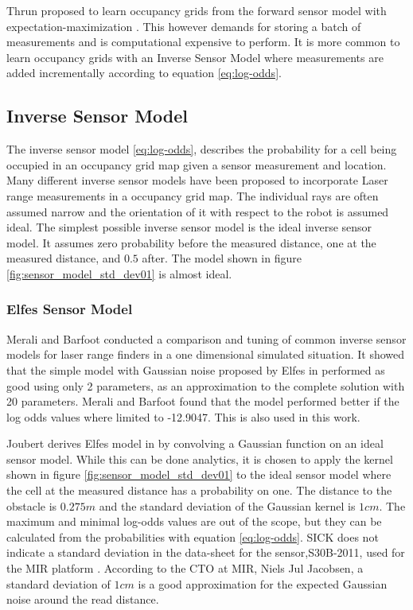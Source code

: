 Thrun proposed to learn occupancy grids from the forward sensor model with expectation-maximization \cite{probRob}.
This however demands for storing a batch of measurements and is computational expensive to perform. 
It is more common to learn occupancy grids with an Inverse Sensor Model where measurements are added incrementally according to equation \ref{eq:log-odds}. 

\subsection{Inverse Sensor Model}
The inverse sensor model \ref{eq:log-odds}, describes the probability for a cell being occupied in an occupancy grid map given a sensor measurement and location.
Many different inverse sensor models have been proposed to incorporate Laser range measurements in a occupancy grid map. The individual rays are often assumed narrow and the orientation of it with respect to the robot is assumed ideal.
The simplest possible inverse sensor model is the 
ideal inverse sensor model. It assumes zero probability before the measured distance, one at the measured distance, and $0.5$ after. The model shown in figure \ref{fig:sensor_model_std_dev01} is almost ideal.

\subsubsection{Elfes Sensor Model}
Merali and Barfoot \cite{sensorModelTuning} conducted a comparison and tuning of common inverse sensor models for laser range finders in a one dimensional simulated situation. It showed that the simple model with Gaussian noise proposed by Elfes in \cite{elfes} performed as good using only 2 parameters, as an approximation to the complete solution with 20 parameters. Merali and Barfoot found that the model performed better if the log odds values where limited to -12.9047. This is also used in this work.

Joubert derives Elfes model in \cite{Joubert2014} by convolving a Gaussian function on an ideal sensor model. While this can be done analytics, it is chosen to apply the kernel shown in figure \ref{fig:sensor_model_std_dev01} to the ideal sensor model where the cell at the measured distance has a probability on one.
The distance to the obstacle is $0.275m$ and the standard deviation of the Gaussian kernel is $1cm$. 
The maximum and minimal log-odds values are out of the scope, but they can be calculated from the probabilities with equation \ref{eq:log-odds}.
SICK does not indicate a standard deviation in the data-sheet for the sensor,S30B-2011, used for the MIR platform \cite{lidarDatasheet}.
According to the CTO at MIR, Niels Jul Jacobsen, a standard deviation of $1cm$ is a good approximation for the expected Gaussian noise around the read distance. 

